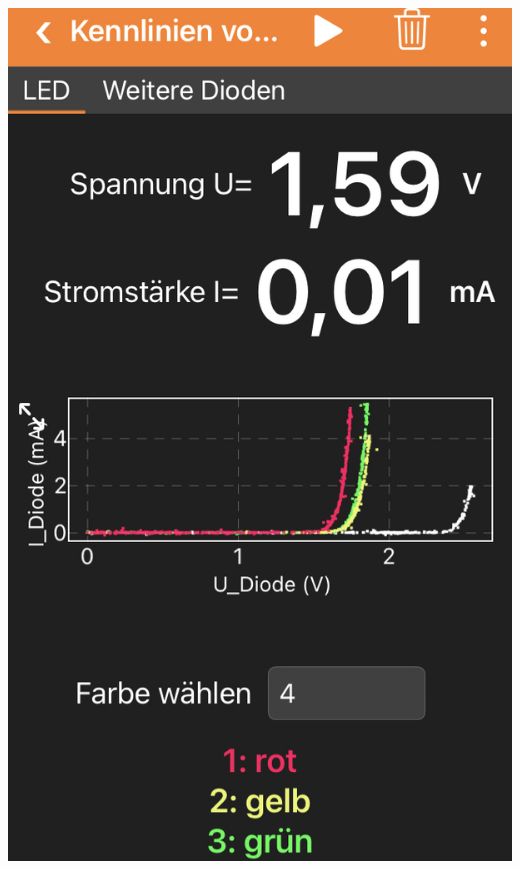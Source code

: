 \documentclass[../main.tex]{subfiles}
\begin{document}
\begin{tcolorbox}
\begin{minipage}[c]{0.2\textwidth}
    \includegraphics[width=1\textwidth]{img/screen}
\end{minipage}


\end{tcolorbox}
\end{document}
